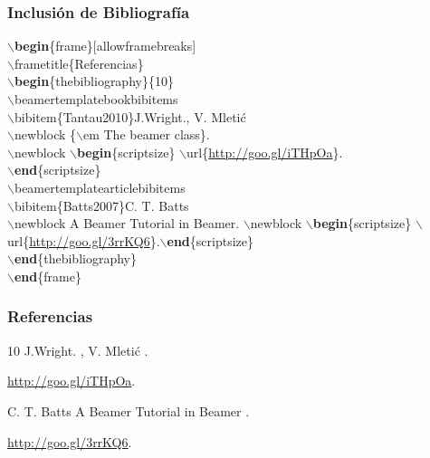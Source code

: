 \documentclass[aspectratio=1610]{beamer}%
\begin{document}
\begin{frame}[fragile]
\frametitle{\textbf{Inclusión de Bibliografía}}
\justifying

$\backslash$\textbf{begin}\{frame\}[allowframebreaks]\\
$\backslash$frametitle\{Referencias\} \\
$\backslash$\textbf{begin}\{thebibliography\}\{10\}\\
$\backslash$beamertemplatebookbibitems\\
$\backslash$bibitem\{Tantau2010\}J.Wright., V. Mleti\'c\\
$\backslash$newblock \{$\backslash$em The beamer class\}.\\
$\backslash$newblock $\backslash$\textbf{begin}\{scriptsize\} $\backslash$url\{\url{http://goo.gl/iTHpOa}\}.\\
$\backslash$\textbf{end}\{scriptsize\}\\
$\backslash$beamertemplatearticlebibitems \\
$\backslash$bibitem\{Batts2007\}C. T. Batts\\
$\backslash$newblock A Beamer Tutorial in Beamer. $\backslash$newblock $\backslash$\textbf{begin}\{scriptsize\} 
$\backslash$url\{\url{http://goo.gl/3rrKQ6}\}.$\backslash$\textbf{end}\{scriptsize\}\\
$\backslash$\textbf{end}\{thebibliography\}\\
$\backslash$\textbf{end}\{frame\}

\end{frame}


\begin{frame}[allowframebreaks]
\frametitle{Referencias} 
\begin{thebibliography}{10}
\beamertemplatebookbibitems
{}J.Wright. , V. Mleti\'c
.
\newblock \begin{scriptsize} \url{http://goo.gl/iTHpOa}.\end{scriptsize}
\beamertemplatearticlebibitems 
{}C. T. Batts
\newblock A Beamer Tutorial in Beamer . \newblock \begin{scriptsize} \url{http://goo.gl/3rrKQ6}.
\end{scriptsize}
\end{thebibliography}
\end{frame}
\end{document}
